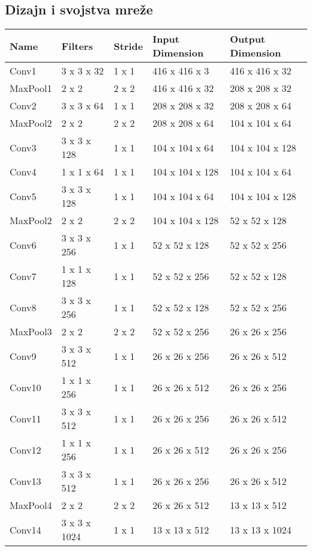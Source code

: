 \subsection{Dizajn i svojstva mreže}

\bigskip
\begin{minipage}{\linewidth}
\centering

\begin{tabular}{||l|l|l|l|l||}
\hline
	Name & Filters & Stride & Input Dimension & Output Dimension \\
\hline
	Conv1 & 3 x 3 x 32 & 1 x 1 & 416 x 416 x   3 & 416 x 416 x  32 \\
\hline
	MaxPool1 & 2 x 2 & 2 x 2 & 416 x 416 x  32 & 208 x 208 x  32 \\
\hline
	Conv2 & 3 x 3 x 64 & 1 x 1 & 208 x 208 x  32 & 208 x 208 x  64 \\
\hline
	MaxPool2 & 2 x 2 & 2 x 2 & 208 x 208 x  64 & 104 x 104 x  64 \\
\hline
	Conv3 & 3 x 3 x 128 & 1 x 1 & 104 x 104 x  64 & 104 x 104 x 128 \\
\hline	
	Conv4 & 1 x 1 x 64 & 1 x 1 & 104 x 104 x 128 & 104 x 104 x  64 \\
\hline
	Conv5 & 3 x 3 x 128 & 1 x 1 & 104 x 104 x  64 & 104 x 104 x 128 \\
\hline
	MaxPool2 & 2 x 2 & 2 x 2 & 104 x 104 x 128 & 52 x  52 x 128 \\
\hline
	Conv6 & 3 x 3 x 256 & 1 x 1 & 52 x  52 x 128 & 52 x  52 x 256 \\
\hline
	Conv7 & 1 x 1 x 128 & 1 x 1 & 52 x  52 x 256 & 52 x  52 x 128 \\
\hline
	Conv8 &  3 x 3 x 256 & 1 x 1 & 52 x  52 x 128 & 52 x  52 x 256 \\
\hline
	MaxPool3 & 2 x 2 & 2 x 2 & 52 x  52 x 256 & 26 x  26 x 256 \\
\hline
	Conv9 & 3 x 3 x 512 & 1 x 1 & 26 x  26 x 256 & 26 x  26 x 512 \\
\hline
	Conv10 & 1 x 1 x 256 & 1 x 1 & 26 x  26 x 512 & 26 x  26 x 256 \\
\hline
	Conv11 & 3 x 3 x 512 & 1 x 1 & 26 x  26 x 256 & 26 x  26 x 512\\
\hline
	Conv12 & 1 x 1 x 256 & 1 x 1 & 26 x  26 x 512 & 26 x  26 x 256 \\
\hline
	Conv13 & 3 x 3 x 512 & 1 x 1 & 26 x  26 x 256 & 26 x  26 x 512 \\
\hline
	MaxPool4 & 2 x 2 & 2 x 2 & 26 x  26 x 512 & 13 x  13 x 512 \\
\hline
	Conv14 & 3 x 3 x 1024 & 1 x 1 & 13 x  13 x 512 & 13 x  13 x 1024 \\

\end{tabular}
\end{minipage}

